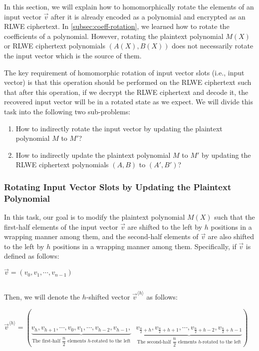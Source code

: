 In this section, we will explain how to homomorphically rotate the elements of an input vector $\vec{v}$ after it is already encoded as a polynomial and encrypted as an RLWE ciphertext. In \autoref{subsec:coeff-rotation}, we learned how to rotate the coefficients of a polynomial. However, rotating the plaintext polynomial $M(X)$ or RLWE ciphertext polynomials $(A(X), B(X))$ does not necessarily rotate the input vector which is the source of them. 

The key requirement of homomorphic rotation of input vector slots (i.e., input vector) is that this operation should be performed on the RLWE ciphertext such that after this operation, if we decrypt the RLWE ciphertext and decode it, the recovered input vector will be in a rotated state as we expect. We will divide this task into the following two sub-problems:

\begin{enumerate}[leftmargin=3\parindent]
\item How to indirectly rotate the input vector by updating the plaintext polynomial $M$ to $M'$?

\item How to indirectly update the plaintext polynomial $M$ to $M'$ by updating the RLWE ciphertext polynomials $(A, B)$ to $(A', B')$?
\end{enumerate}



\subsubsection{Rotating Input Vector Slots by Updating the Plaintext Polynomial}

In this task, our goal is to modify the plaintext polynomial $M(X)$ such that the first-half elements of the input vector $\vec{v}$ are shifted to the left by $h$ positions in a wrapping manner among them, and the second-half elements of $\vec{v}$ are also shifted to the left by $h$ positions in a wrapping manner among them. Specifically, if $\vec{v}$ is defined as follows:

$\vec{v} = (v_0, v_1, \cdots, v_{n-1})$

$ $

Then, we will denote the $h$-shifted vector $\vec{v}^{\langle h \rangle}$ as follows:  

$\vec{v}^{\langle h \rangle} = (\underbrace{v_h, v_{h+1}, \cdots, v_0, v_1, \cdots, v_{h-2}, v_{h-1},}_{\text{The first-half $\dfrac{n}{2}$ elements $h$-rotated to the left}} \text{ } \underbrace{v_{\frac{n}{2}+h}, v_{\frac{n}{2}+h+1}, \cdots, v_{\frac{n}{2}+h-2}, v_{\frac{n}{2}+h-1}}_{\text{The second-half $\dfrac{n}{2}$ elements $h$-rotated to the left}})$

